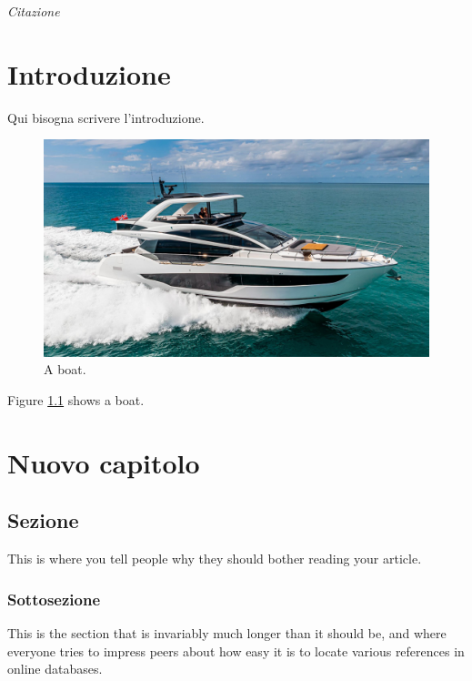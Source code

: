 \documentclass[10pt, twoside, openany]{book}
\begin{document}
\begin{frontespizio}
\end{frontespizio}

\begin{flushright}
\null{}
\textit{Citazione}
\null
\end{flushright}

\tableofcontents
\listoffigures
\listoftables

\chapter{Introduzione}
Qui bisogna scrivere l'introduzione.
\begin{figure}
  \includegraphics[width=\linewidth]{boat.jpeg}
  \caption{A boat.}
  \label{fig:boat1}
\end{figure}
Figure \ref{fig:boat1} shows a boat.

\chapter{Nuovo capitolo}
\section{Sezione}
This is where you tell people why they should bother reading your article.

\subsection{Sottosezione}
This is the section that is invariably much longer than it should be, and
where everyone tries to impress peers about how easy it is to locate various
references in online databases.
\end{document}
